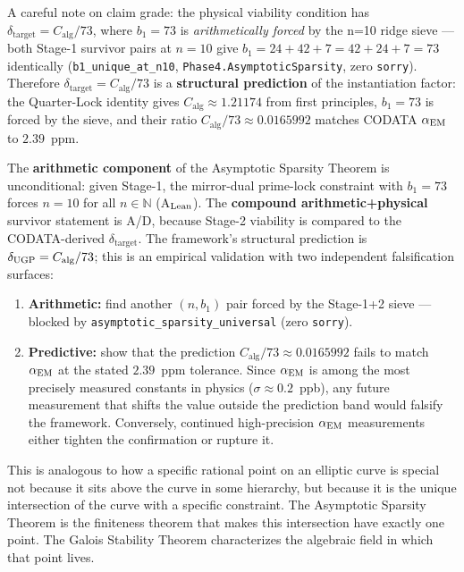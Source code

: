 \documentclass[11pt]{article}
\theoremstyle{remark}
\newcommand{\bone}{b_1}
\newcommand{\deltatar}{\delta_{\mathrm{target}}}
\newcommand{\Calg}{C_{\mathrm{alg}}}
\begin{document}
A careful note on claim grade: the physical viability condition has
$\deltatar = \Calg/73$, where $\bone = 73$ is \emph{arithmetically forced} by
the n=10 ridge sieve --- both Stage-1 survivor pairs at $n{=}10$ give
$b_1 = 24{+}42{+}7 = 42{+}24{+}7 = 73$ identically
(\texttt{b1\_unique\_at\_n10}, \texttt{Phase4.AsymptoticSparsity}, zero \texttt{sorry}).
Therefore $\deltatar = \Calg/73$ is a \textbf{structural prediction} of the
instantiation factor: the Quarter-Lock identity gives $\Calg \approx 1.21174$ from
first principles, $b_1 = 73$ is forced by the sieve, and their ratio
$\Calg/73 \approx 0.0165992$ matches CODATA $\alpha_{\rm EM}$ to $2.39$~ppm.

The \textbf{arithmetic component} of the Asymptotic Sparsity Theorem is unconditional: given Stage-1, the mirror-dual prime-lock constraint with $b_1=73$ forces $n=10$ for all $n \in \mathbb{N}$ (A$_{\rm Lean}$).  The \textbf{compound arithmetic+physical} survivor statement is A/D, because Stage-2 viability is compared to the CODATA-derived $\deltatar$.  The framework's structural prediction is $\delta_{\rm UGP}=\Calg/73$; this is an empirical validation with two independent
falsification surfaces:
\begin{enumerate}[leftmargin=2em,itemsep=2pt]
  \item \textbf{Arithmetic:} find another $(n, b_1)$ pair forced by the Stage-1+2
    sieve --- blocked by \texttt{asymptotic\_sparsity\_universal} (zero \texttt{sorry}).
  \item \textbf{Predictive:} show that the prediction $\Calg/73 \approx 0.0165992$
    fails to match $\alpha_{\rm EM}$ at the stated $2.39$~ppm tolerance.
    Since $\alpha_{\rm EM}$ is among the most precisely measured constants in physics
    ($\sigma \approx 0.2$~ppb), any future measurement that shifts the value
    outside the prediction band would falsify the framework.
    Conversely, continued high-precision $\alpha_{\rm EM}$ measurements either
    tighten the confirmation or rupture it.
\end{enumerate}

This is analogous to how a specific rational point on an elliptic curve is special
not because it sits above the curve in some hierarchy, but because it is the unique
intersection of the curve with a specific constraint.
The Asymptotic Sparsity Theorem is the finiteness theorem that makes this
intersection have exactly one point.
The Galois Stability Theorem characterizes the algebraic field in which that point lives.
\end{document}
